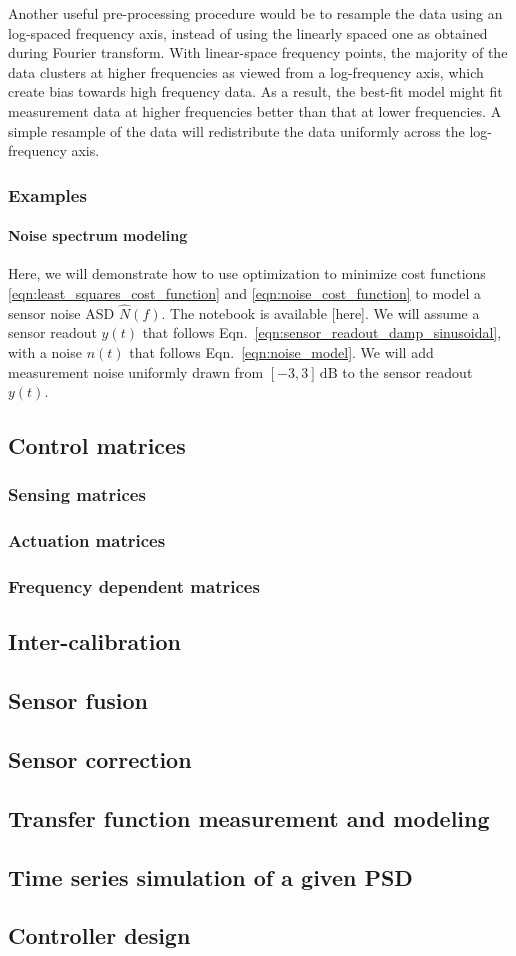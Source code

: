 Another useful pre-processing procedure would be to resample the data using an log-spaced frequency axis, instead of using the linearly spaced one as obtained during Fourier transform.
With linear-space frequency points, the majority of the data clusters at higher frequencies as viewed from a log-frequency axis, which create bias towards high frequency data.
As a result, the best-fit model might fit measurement data at higher frequencies better than that at lower frequencies.
A simple resample of the data will redistribute the data uniformly across the log-frequency axis.

\subsubsection{Examples \label{sec:curve_fitting_examples}}
\paragraph{Noise spectrum modeling}
Here, we will demonstrate how to use optimization to minimize cost functions \eqref{eqn:least_squares_cost_function} and \eqref{eqn:noise_cost_function} to model a sensor noise ASD $\hat{N}(f)$.
The notebook is available [here].
We will assume a sensor readout $y(t)$ that follows Eqn.~\eqref{eqn:sensor_readout_damp_sinusoidal}, with a noise $n(t)$ that follows Eqn.~\eqref{eqn:noise_model}.
We will add measurement noise uniformly drawn from $[-3, 3]\,\mathrm{dB}$ to the sensor readout $y(t)$.

\subsection{Control matrices}
\subsubsection{Sensing matrices}
\subsubsection{Actuation matrices}
\subsubsection{Frequency dependent matrices}
\subsection{Inter-calibration}
\subsection{Sensor fusion}
\subsection{Sensor correction}
\subsection{Transfer function measurement and modeling}
\subsection{Time series simulation of a given PSD}
\subsection{Controller design}

